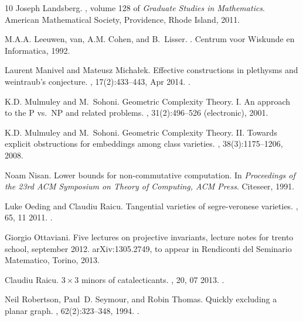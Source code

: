 \documentclass[10pt,a4paper]{article}
\numberwithin{equation}{section}
\theoremstyle{definition}
\begin{document}
\begin{thebibliography}{10}
Joseph Landsberg.
, volume 128 of {\em Graduate
  Studies in Mathematics}.
\newblock American Mathematical Society, Providence, Rhode Island, 2011.

M.A.A. {Leeuwen, van}, A.M. Cohen, and B.~Lisser.
.
\newblock Centrum voor Wiskunde en Informatica, 1992.

Laurent Manivel and Mateusz Micha{\l}ek.
\newblock Effective constructions in plethysms and weintraub's conjecture.
, 17(2):433--443, Apr 2014.
\newblock \href {https://doi.org/10.1007/s10468-012-9402-y}
  {}.

K.D. Mulmuley and M.~Sohoni.
\newblock Geometric {C}omplexity {T}heory. {I}. {A}n approach to the {P} vs.\
  {NP} and related problems.
, 31(2):496--526 (electronic), 2001.

K.D. Mulmuley and M.~Sohoni.
\newblock Geometric {C}omplexity {T}heory. {II}. {T}owards explicit
  obstructions for embeddings among class varieties.
, 38(3):1175--1206, 2008.

Noam Nisan.
\newblock Lower bounds for non-commutative computation.
\newblock In {\em Proceedings of the 23rd ACM Symposium on Theory of Computing,
  ACM Press}. Citeseer, 1991.

Luke Oeding and Claudiu Raicu.
\newblock Tangential varieties of segre-veronese varieties.
, 65, 11 2011.
\newblock \href {https://doi.org/10.1007/s13348-014-0111-1}
  {}.

Giorgio Ottaviani.
\newblock Five lectures on projective invariants, lecture notes for trento
  school, september 2012.
\newblock arXiv:1305.2749, to appear in Rendiconti del Seminario Matematico,
  Torino, 2013.

Claudiu Raicu.
\newblock $3\times 3$ minors of catalecticants.
, 20, 07 2013.
\newblock \href {https://doi.org/10.4310/MRL.2013.v20.n4.a10}
  {}.

Neil Robertson, Paul~D. Seymour, and Robin Thomas.
\newblock Quickly excluding a planar graph.
, 62(2):323--348, 1994.
\newblock \href {https://doi.org/10.1006/jctb.1994.1073}
  {}.


\end{thebibliography}
\end{document}
